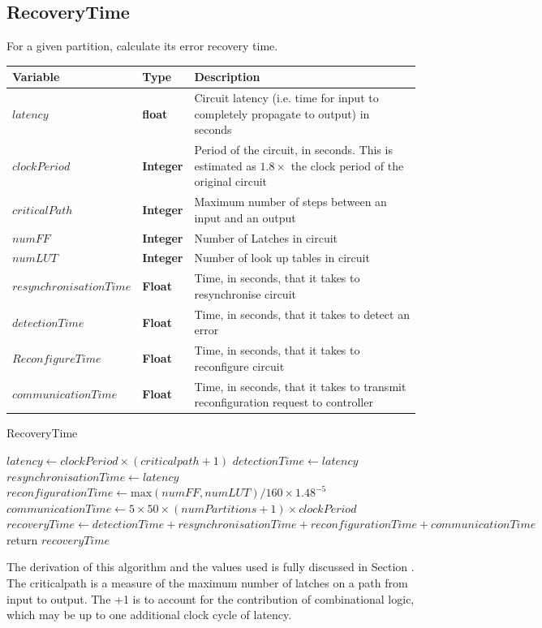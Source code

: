 \documentclass[12pt,final,oneside]{dwThesis} %
\begin{document}
   \newpage
   \subsection{RecoveryTime}
   For a given partition, calculate its error recovery time.
   \begin{algorithm}
      \begin{center}
         \begin{tabularx}{\linewidth}{llX}
            \toprule
            Variable & Type & Description\\
            \midrule
            $latency$ &\textbf{  float } &  Circuit latency (i.e. time for input to completely propagate to output) in seconds\\
            $clockPeriod$ &\textbf{  Integer } &  Period of the circuit, in seconds. This is estimated as $1.8\times$ the clock period of the original circuit\\
            $criticalPath$ &\textbf{  Integer } &  Maximum number of steps between an input and an output\\
            $numFF$ &\textbf{  Integer } &  Number of Latches in circuit\\
            $numLUT$ &\textbf{  Integer } &  Number of look up tables in circuit\\
            $resynchronisationTime$ &\textbf{  Float } &  Time, in seconds, that it takes to resynchronise circuit\\
            $detectionTime$ &\textbf{  Float } &  Time, in seconds, that it takes to detect an error\\
            $ReconfigureTime$ &\textbf{  Float } &  Time, in seconds, that it takes to reconfigure circuit\\
            $communicationTime$ &\textbf{  Float } &  Time, in seconds, that it takes to transmit reconfiguration request to controller\\
            \bottomrule
         \end{tabularx}
      \end{center}
      \caption{RecoveryTime}\label{recoverytime}
      \begin{algorithmic}[1]
         \State $latency \gets clockPeriod\times{}(criticalpath+1)$
         \State $detectionTime \gets latency$
         \State $resynchronisationTime \gets latency$
         \State $reconfigurationTime \gets \mbox{max}(numFF, numLUT)/160\times 1.48^{-5}$
         \State $communicationTime \gets 5\times 50\times(numPartitions+1)\times clockPeriod$
         \State $recoveryTime \gets detectionTime+resynchronisationTime+reconfigurationTime+communicationTime$
         \State return $recoveryTime$
         \EndProcedure
      \end{algorithmic}
   \end{algorithm}
   The derivation of this algorithm and the values used is fully discussed in Section . The criticalpath is a measure of the maximum number of latches on a path from input to output. The +1 is to account for the contribution of combinational logic, which may be up to one additional clock cycle of latency.
\end{document}
